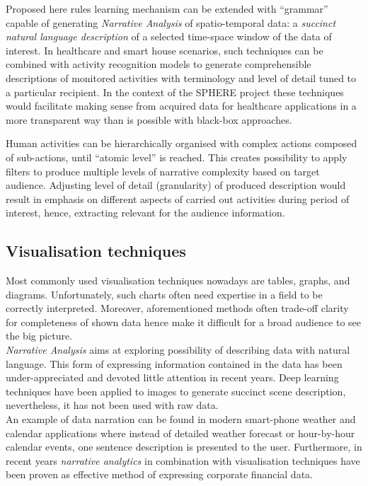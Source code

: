 \documentclass[12pt, a4paper, pdflatex, leqno, twoside, openright]{report}
\begin{document}
Proposed here rules learning mechanism can be extended with ``grammar'' capable of generating \emph{Narrative Analysis} of spatio-temporal data: a \emph{succinct natural language description} of a selected time-space window of the data of interest. In healthcare and smart house scenarios, such techniques can be combined with activity recognition models to generate comprehensible descriptions of monitored activities with terminology and level of detail tuned to a particular recipient. In the context of the SPHERE project these techniques would facilitate making sense from acquired data for healthcare applications in a more transparent way than is possible with black-box approaches.

Human activities can be hierarchically organised with complex actions composed of sub-actions, until ``atomic level'' is reached. This creates possibility to apply filters to produce multiple levels of narrative complexity based on target audience. Adjusting level of detail (granularity) of produced description would result in emphasis on different aspects of carried out activities during period of interest, hence, extracting relevant for the audience information.\\

    \subsection{Visualisation techniques}
Most commonly used visualisation techniques nowadays are tables, graphs, and diagrams. Unfortunately, such charts often need expertise in a field to be correctly interpreted. Moreover, aforementioned methods often trade-off clarity for completeness of shown data hence make it difficult for a broad audience to see the big picture.\\

\emph{Narrative Analysis} aims at exploring possibility of describing data with natural language. This form of expressing information contained in the data has been under-appreciated and devoted little attention in recent years. Deep learning techniques have been applied to images to generate succinct scene description, nevertheless, it has not been used with raw data.\\
An example of data narration can be found in modern smart-phone weather and calendar applications where instead of detailed weather forecast or hour-by-hour calendar events, one sentence description is presented to the user. Furthermore, in recent years \emph{narrative analytics} in combination with visualisation techniques have been proven as effective method of expressing corporate financial data.\\
\end{document}
